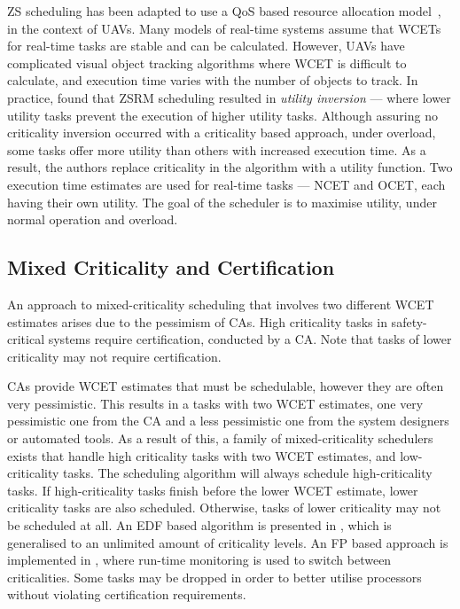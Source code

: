 \gls{ZS} scheduling has been adapted to use a \gls{QoS} based resource allocation model~\citep{deNiz_WSRR_12}, in the context of \glspl{UAV}.
Many models of real-time systems assume that \glspl{WCET} for real-time tasks are stable and can be calculated.
However, \glspl{UAV} have complicated visual object tracking algorithms where \gls{WCET} is difficult to calculate, and execution time varies with the number of objects to track.
In practice,  found that \gls{ZS}\gls{RM} scheduling resulted in \emph{utility inversion} --- where lower utility tasks prevent the execution of higher utility tasks.
Although assuring no criticality inversion occurred with a criticality based approach, under overload, some tasks offer more utility than others with increased execution time.
As a result, the authors replace criticality in the algorithm with a utility function.
Two execution time estimates are used for real-time tasks --- \gls{NCET} and \gls{OCET}, each having their own utility.
The goal of the scheduler is to maximise utility, under normal operation and overload.


\subsection{Mixed Criticality and Certification}
\label{sec:multiple-criticality}

An approach to mixed-criticality scheduling that involves two different WCET estimates arises due to the pessimism of \glspl{CA}.
High criticality tasks in safety-critical systems require certification, conducted by a \gls{CA}.
Note that tasks of lower criticality may not require certification.

\Glspl{CA} provide {\gls{WCET}} estimates that must be schedulable, however they are often very pessimistic.
This results in a tasks with two {\gls{WCET}} estimates, one very pessimistic one from the \gls{CA} and a less pessimistic one from the system designers or automated tools.
As a result of this, a family of mixed-criticality schedulers exists that handle high criticality tasks with two {\gls{WCET}} estimates, and low-criticality tasks.
The scheduling algorithm will always schedule high-criticality tasks.
If high-criticality tasks finish before the lower \gls{WCET} estimate, lower criticality tasks are also scheduled.
Otherwise, tasks of lower criticality may not be scheduled at all.
An \gls{EDF} based algorithm is presented in \citet{Baruah_BDMVS_11}, which is generalised to an unlimited amount of criticality levels.
An \gls{FP} based approach is implemented in \citet{Pathan:phd}, where run-time monitoring is used to switch between criticalities.
Some tasks may be dropped in order to better utilise processors without violating certification requirements.

